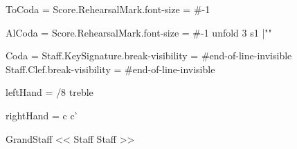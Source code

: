 ToCoda = {
    \once \override Score.RehearsalMark.font-size = #-1
    \mark {}
}

AlCoda = {
    \cadenzaOn \stopStaff
    \once \override Score.RehearsalMark.font-size = #-1
    \mark {}
    \repeat unfold 3 { s1 \bar "" }
    \startStaff \cadenzaOff
}

Coda = {
    \break
    \mark {}
    \once \override Staff.KeySignature.break-visibility = #end-of-line-invisible
    \once \override Staff.Clef.break-visibility = #end-of-line-invisible
}

leftHand = {
  /8
  \clef treble
  \PrimoA
  \Segno
  \PrimoB
  \PrimoC
  \ToCoda
  \PrimoD
  \PrimoE
  \AlCoda
  \Coda
  \PrimoF
  \PrimoC
  \PrimoD
}

rightHand = \transpose c c' \leftHand

\new GrandStaff <<
  \new Staff \rightHand
  \new Staff \leftHand
>>
